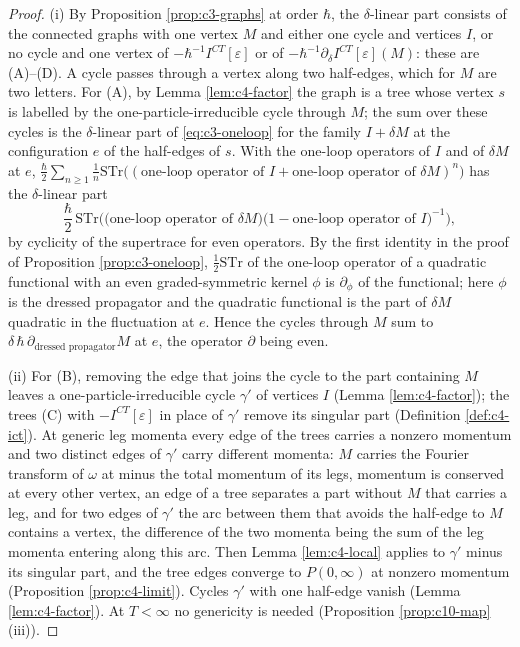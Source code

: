 \begin{proof}
(i) By Proposition \ref{prop:c3-graphs} at order $\hbar$, the $\delta$-linear part consists of the connected graphs with one vertex $M$ and either one cycle and vertices $I$, or no cycle and one vertex of $-\hbar^{-1}I^{CT}[\varepsilon]$ or of $-\hbar^{-1}\partial_\delta I^{CT}[\varepsilon](M)$: these are (A)--(D). A cycle passes through a vertex along two half-edges, which for $M$ are two letters. For (A), by Lemma \ref{lem:c4-factor} the graph is a tree whose vertex $s$ is labelled by the one-particle-irreducible cycle through $M$; the sum over these cycles is the $\delta$-linear part of \eqref{eq:c3-oneloop} for the family $I+\delta M$ at the configuration $e$ of the half-edges of $s$. With the one-loop operators of $I$ and of $\delta M$ at $e$, $\tfrac\hbar2\sum_{n\ge1}\frac1n\mathrm{STr}\big((\text{one-loop operator of }I+\text{one-loop operator of }\delta M)^n\big)$ has the $\delta$-linear part
\[
\frac\hbar2\,\mathrm{STr}\Big(\big(\text{one-loop operator of }\delta M\big)\big(1-\text{one-loop operator of }I\big)^{-1}\Big),
\]
by cyclicity of the supertrace for even operators. By the first identity in the proof of Proposition \ref{prop:c3-oneloop}, $\tfrac12\mathrm{STr}$ of the one-loop operator of a quadratic functional with an even graded-symmetric kernel $\phi$ is $\partial_\phi$ of the functional; here $\phi$ is the dressed propagator and the quadratic functional is the part of $\delta M$ quadratic in the fluctuation at $e$. Hence the cycles through $M$ sum to $\delta\,\hbar\,\partial_{\text{dressed propagator}}M$ at $e$, the operator $\partial$ being even.

(ii) For (B), removing the edge that joins the cycle to the part containing $M$ leaves a one-particle-irreducible cycle $\gamma'$ of vertices $I$ (Lemma \ref{lem:c4-factor}); the trees (C) with $-I^{CT}[\varepsilon]$ in place of $\gamma'$ remove its singular part (Definition \ref{def:c4-ict}). At generic leg momenta every edge of the trees carries a nonzero momentum and two distinct edges of $\gamma'$ carry different momenta: $M$ carries the Fourier transform of $\omega$ at minus the total momentum of its legs, momentum is conserved at every other vertex, an edge of a tree separates a part without $M$ that carries a leg, and for two edges of $\gamma'$ the arc between them that avoids the half-edge to $M$ contains a vertex, the difference of the two momenta being the sum of the leg momenta entering along this arc. Then Lemma \ref{lem:c4-local} applies to $\gamma'$ minus its singular part, and the tree edges converge to $P(0,\infty)$ at nonzero momentum (Proposition \ref{prop:c4-limit}). Cycles $\gamma'$ with one half-edge vanish (Lemma \ref{lem:c4-factor}). At $T<\infty$ no genericity is needed (Proposition \ref{prop:c10-map} (iii)).


\end{proof}
